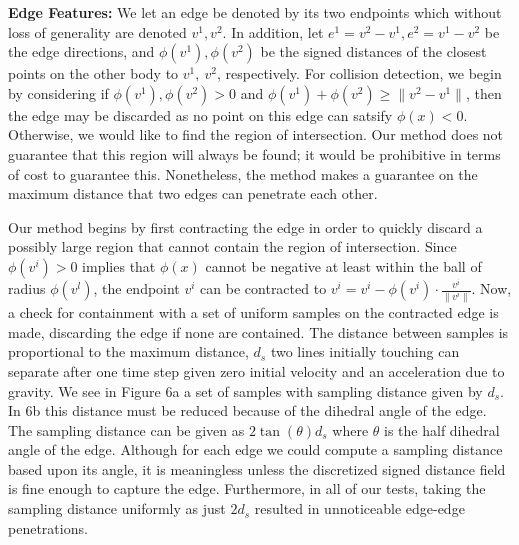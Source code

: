 \documentclass[9pt,twocolumn]{article}
\begin{document}
{\bf Edge Features:} We let an edge be denoted by its two endpoints which without loss of generality are denoted $v^1, v^2$. In addition, let $e^1 = v^2 - v^1, e^2 = v^1 - v^2$ be the edge directions, and $\phi(v^1), \phi(v^2)$ be the signed distances of the closest points on the other body to $v^1, \ v^2$, respectively. For collision detection, we begin by considering if $\phi(v^1), \phi(v^2) > 0$ and $\phi(v^1) + \phi(v^2) \ge \|v^2 - v^1\|$, then the edge may be discarded as no point on this edge can satsify $\phi(x) < 0$. Otherwise, we would like to find the region of intersection. Our method does not guarantee that this region will always be found; it would be prohibitive in terms of cost to guarantee this. Nonetheless, the method makes a guarantee on the maximum distance that two edges can penetrate each other. \newline

Our method begins by first contracting the edge in order to quickly discard a possibly large region that cannot contain the region of intersection. Since $\phi(v^i) > 0$ implies that $\phi(x)$ cannot be negative at least within the ball of radius $\phi(v^l)$, the endpoint $v^i$ can be contracted to $v^i = v^i - \phi(v^i) \cdot \frac{v^i}{\|v^i\|}$. Now, a check for containment with a set of uniform samples on the contracted edge is made, discarding the edge if none are contained. The distance between samples is proportional to the maximum distance, $d_s$ two lines initially touching can separate after one time step given zero initial velocity and an acceleration due to gravity. We see in Figure 6a a set of samples with sampling distance given by $d_s$. In 6b this distance must be reduced because of the dihedral angle of the edge. The sampling distance can be given as $2\tan(\theta) d_s$ where $\theta$ is the half dihedral angle of the edge. Although for each edge we could compute a sampling distance based upon its  angle, it is meaningless unless the discretized signed distance field is fine enough to capture the edge. Furthermore, in all of our tests, taking the sampling distance uniformly as just $2 d_s$ resulted in unnoticeable edge-edge penetrations. \newline
\end{document}
